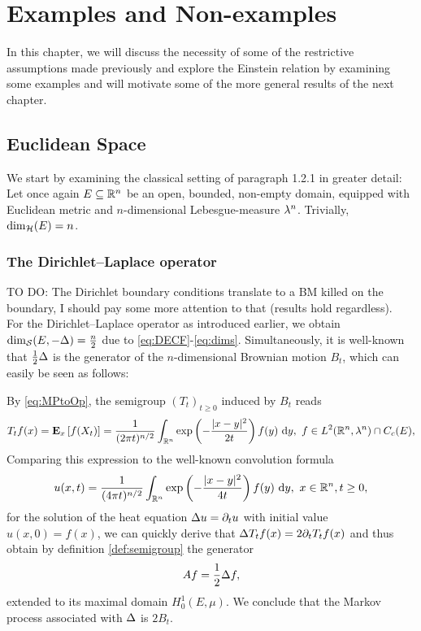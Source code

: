 \chapter{Examples and Non-examples}

In this chapter, we will discuss the necessity of some of the restrictive assumptions made previously and explore the Einstein relation by examining some examples and will motivate some of the more general results of the next chapter.

\section{Euclidean Space}

We start by examining the classical setting of paragraph 1.2.1 in greater detail: Let once again $E\subseteq\mathbb{R}^n$ be an open, bounded, non-empty domain, equipped with Euclidean metric and $n$-dimensional Lebesgue-measure $\lambda^n$. Trivially, $\dim_{\mathcal{H}}(E)=n$. 

\subsection{The Dirichlet--Laplace operator}

TO DO: The Dirichlet boundary conditions translate to a BM killed on the boundary, I should pay some more attention to that (results hold regardless).\\

For the Dirichlet--Laplace operator as introduced earlier, we obtain $\dim_{\mathcal{S}}(E,-\Delta)=\frac{n}{2}$ due to \eqref{eq:DECF}-\eqref{eq:dims}. Simultaneously, it is well-known that $\frac{1}{2}\Delta$ is the generator of the $n$-dimensional Brownian motion $B_t$, which can easily be seen as follows:

By \eqref{eq:MPtoOp}, the semigroup $(T_t)_{t\geq0}$ induced by $B_t$ reads
\[
  T_tf(x)=\PTEp{f(X_t)}{x}=\frac{1}{(2\pi t)^{n/2}}\int_{\IR^n} \exp\left(-\frac{|x-y|^2}{2t}\right)f(y)\,\Di y,\ f\in L^2(\IR^n,\gl^n)\cap C_c(E),
\]
Comparing this expression to the well-known convolution formula
\[
  u(x,t)=\frac{1}{(4\pi t)^{n/2}}\int_{\mathbb{R}^n} \exp\left(-\frac{|x-y|^2}{4t}\right)f(y)\,\operatorname{d}\! y,\ x\in\mathbb{R}^n, t\geq0,
\]
for the solution of the heat equation $\Delta u=\partial_t u$ with initial value $u(x,0)=f(x)$, we can quickly derive that $\Delta T_tf(x)=2\partial_t T_tf(x)$ and thus obtain by definition \ref{def:semigroup} the generator
\[
  Af=\frac{1}{2}\Delta f,
\]
extended to its maximal domain $H_0^1(E,\mu)$. We conclude that the Markov process associated with $\Delta$ is $2B_t$.

